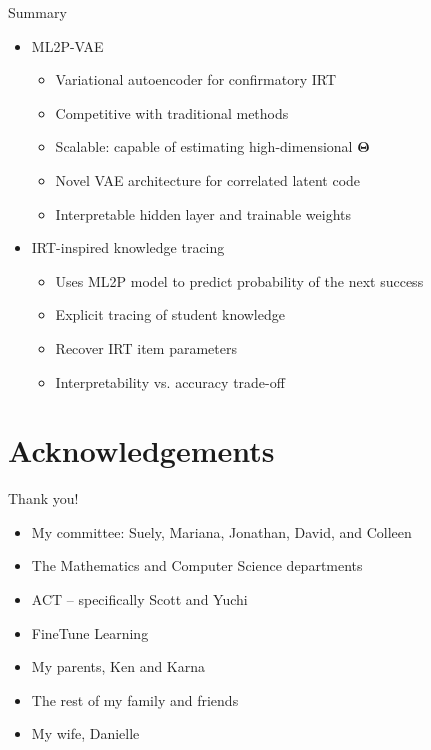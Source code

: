 \documentclass{beamer}
\newcommand{\vect}[1]{\boldsymbol{#1}}
\theoremstyle{definition}
\begin{document}
\begin{frame}{Summary}
  \begin{itemize}
    \item ML2P-VAE
      \begin{itemize}
        \item Variational autoencoder for confirmatory IRT
        \item<2-> Competitive with traditional methods
        \item<2-> Scalable: capable of estimating high-dimensional $\vect \Theta$
        \item<3-> Novel VAE architecture for correlated latent code
        \item<3-> Interpretable hidden layer and trainable weights
      \end{itemize}
      \bigskip
    \item IRT-inspired knowledge tracing
      \begin{itemize}
        \item Uses ML2P model to predict probability of the next success
        \item<4-> Explicit tracing of student knowledge
        \item<4-> Recover IRT item parameters
        \item<4-> Interpretability vs. accuracy trade-off
      \end{itemize}
  \end{itemize}
\end{frame}


\section*{Acknowledgements}
\begin{frame}{Thank you!}
  \begin{itemize}
    \item My committee: Suely, Mariana, Jonathan, David, and Colleen
    \item The Mathematics and Computer Science departments
    \item<2-> ACT -- specifically Scott and Yuchi
    \item<2-> FineTune Learning
    \item<3-> My parents, Ken and Karna
    \item<3-> The rest of my family and friends
    \item<3-> My wife, Danielle
  \end{itemize}
\end{frame}
\end{document}
